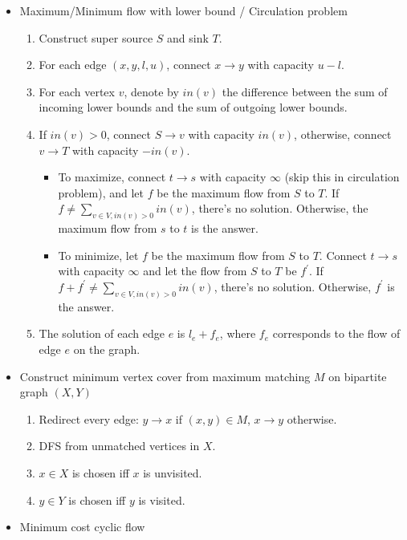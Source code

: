 
\begin{itemize}
    \item Maximum/Minimum flow with lower bound / Circulation problem
    \begin{enumerate}
        \item Construct super source $S$ and sink $T$.
        \item For each edge $(x, y, l, u)$, connect $x \rightarrow y$ with capacity $u - l$.
        \item For each vertex $v$, denote by $in(v)$ the difference between the sum of incoming lower bounds and the sum of outgoing lower bounds.
        \item If $in(v) > 0$, connect $S \rightarrow v$ with capacity $in(v)$, otherwise, connect $v \rightarrow T$ with capacity $-in(v)$.
        \begin{itemize}
            \item To maximize, connect $t \rightarrow s$ with capacity $\infty$ (skip this in circulation problem), and let $f$ be the maximum flow from $S$ to $T$. If $f \neq \sum_{v \in V, in(v) > 0}{in(v)}$, there's no solution. Otherwise, the maximum flow from $s$ to $t$ is the answer.
            \item To minimize, let $f$ be the maximum flow from $S$ to $T$. Connect $t \rightarrow s$ with capacity $\infty$ and let the flow from $S$ to $T$ be $f^\prime$. If $f + f^\prime \neq \sum_{v \in V, in(v) > 0}{in(v)}$, there's no solution. Otherwise, $f^\prime$ is the answer.
        \end{itemize}
        \item The solution of each edge $e$ is $l_e + f_e$, where $f_e$ corresponds to the flow of edge $e$ on the graph.
    \end{enumerate}
    \item Construct minimum vertex cover from maximum matching $M$ on bipartite graph $(X, Y)$
    \begin{enumerate}
        \item Redirect every edge: $y \rightarrow x$ if $(x, y) \in M$, $x \rightarrow y$ otherwise.
        \item DFS from unmatched vertices in $X$.
        \item $x \in X$ is chosen iff $x$ is unvisited.
        \item $y \in Y$ is chosen iff $y$ is visited.
    \end{enumerate}
    \item Minimum cost cyclic flow

\end{itemize}
